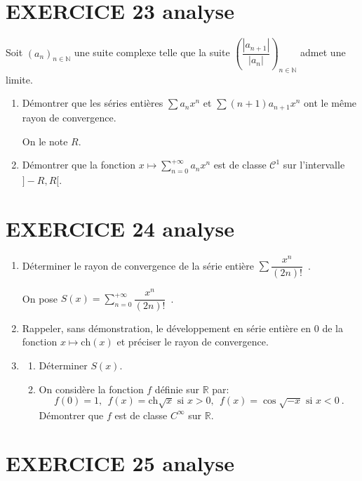 \documentclass[10pt,oneside]{article}
\begin{document}
\begin{flushleft}
\section*{EXERCICE 23 \:analyse }

Soit $\left( a_{n}\right) _{n\in \mathbb{N}}$ une suite complexe telle que la suite $\left( \dfrac{\left\vert a_{n+1}\right\vert }{\left\vert a_{n}\right\vert }\right) _{n\in \mathbb{N}}$ admet une limite.

\begin{enumerate}
\item Démontrer que les s\'{e}ries enti\`{e}res $\displaystyle\sum a_{n}x^{n}$ et $\displaystyle\sum (n+1)a_{n+1}x^{n}$ ont le m\^{e}me rayon de convergence.

On le note $R$.

\item Démontrer que la fonction $x\longmapsto \displaystyle\sum\limits_{n=0}^{+\infty }a_{n}x^{n}$ est de classe $\mathcal{C}^1$  sur l'intervalle $]-R,R[$.
\end{enumerate}

\section*{EXERCICE 24 \:analyse }

\begin{enumerate}
\item Déterminer le rayon de convergence de la série entière $\displaystyle\sum\dfrac{x^n}{(2n)!}$~.\bigskip

On pose $S(x)=\displaystyle\sum_{n=0}^{+\infty}\dfrac{x^n}{(2n)!}$~.
\item Rappeler, sans démonstration,  le développement en série entière en 0 de la fonction $x\mapsto \text{ch}(x)$  et préciser le rayon de convergence.
\item \begin{enumerate}
	\item Déterminer $S(x)$.
	\item On considère la fonction $f$ définie sur $\mathbb{R}$ par:
	\begin{equation*}
	f(0)=1,\ \ f(x)=\text{ch}\sqrt x\text{ si $x>0$},\ \ f(x)=\cos\sqrt{-x}\text{ si $x<0$}\ .
	\end{equation*}
	Démontrer que $f$ est de classe $C^{\infty}$ sur $\mathbb{R}$.
	\end{enumerate}
\end{enumerate}

\section*{EXERCICE 25 \:analyse }


\end{flushleft}
\end{document}
